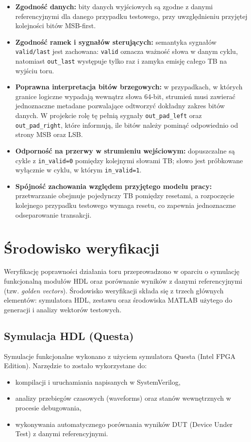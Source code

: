 \begin{itemize}
    \item \textbf{Zgodność danych:} bity danych wyjściowych są zgodne z danymi referencyjnymi dla danego przypadku testowego,
    przy uwzględnieniu przyjętej kolejności bitów MSB-first.

    \item \textbf{Zgodność ramek i sygnałów sterujących:} semantyka sygnałów \texttt{valid/last} jest zachowana:
    \texttt{valid} oznacza ważność słowa w danym cyklu, natomiast \texttt{out\_last} występuje tylko raz i zamyka
    emisję całego TB na wyjściu toru. 

    \item \textbf{Poprawna interpretacja bitów brzegowych:} w przypadkach, w których granice logiczne wypadają wewnątrz słowa 64-bit, strumień musi zawierać jednoznaczne metadane pozwalające
    odtworzyć dokładny zakres bitów danych. W projekcie rolę tę pełnią sygnały \texttt{out\_pad\_left} oraz
    \texttt{out\_pad\_right}, które informują, ile bitów należy pominąć odpowiednio od strony MSB oraz LSB. 

    \item \textbf{Odporność na przerwy w strumieniu wejściowym:} dopuszczalne są cykle z \texttt{in\_valid=0} pomiędzy kolejnymi
    słowami TB; słowo jest próbkowane wyłącznie w cyklu, w którym \texttt{in\_valid=1}. 

    \item \textbf{Spójność zachowania względem przyjętego modelu pracy:} przetwarzanie obejmuje pojedynczy TB pomiędzy resetami,
    a rozpoczęcie kolejnego przypadku testowego wymaga resetu, co zapewnia jednoznaczne odseparowanie transakcji. 
\end{itemize}

\section{Środowisko weryfikacji}
\label{sec:walidacja_srodowisko}

Weryfikację poprawności działania toru przeprowadzono w oparciu o symulację funkcjonalną modułów HDL oraz porównanie wyników z danymi referencyjnymi (tzw. \emph{golden vectors}). Środowisko weryfikacji składa się z trzech głównych elementów: symulatora HDL, zestawu  oraz środowiska MATLAB użytego do generacji i analizy wektorów testowych.

\subsection{Symulacja HDL (Questa)}
Symulacje funkcjonalne wykonano z użyciem symulatora Questa (Intel FPGA Edition). Narzędzie to zostało wykorzystane do:
\begin{itemize}
    \item kompilacji i uruchamiania  napisanych w SystemVerilog,
    \item analizy przebiegów czasowych (waveforms) oraz stanów wewnętrznych w procesie debugowania,
    \item wykonywania automatycznego porównania wyników DUT (Device Under Test) z danymi referencyjnymi.
\end{itemize}

